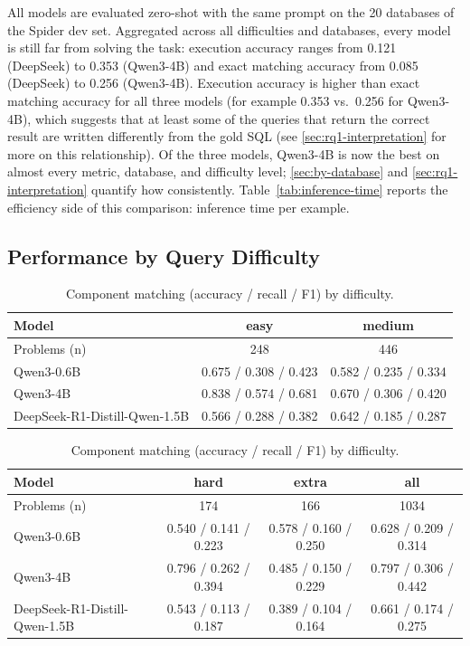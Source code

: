 All models are evaluated zero-shot with the same prompt on the 20 databases of the Spider dev set. Aggregated across all difficulties and databases, every model is still far from solving the task: execution accuracy ranges from 0.121 (DeepSeek) to 0.353 (Qwen3-4B) and exact matching accuracy from 0.085 (DeepSeek) to 0.256 (Qwen3-4B). Execution accuracy is higher than exact matching accuracy for all three models (for example 0.353 vs.\ 0.256 for Qwen3-4B), which suggests that at least some of the queries that return the correct result are written differently from the gold SQL (see \ref{sec:rq1-interpretation} for more on this relationship). Of the three models, Qwen3-4B is now the best on almost every metric, database, and difficulty level; \ref{sec:by-database} and \ref{sec:rq1-interpretation} quantify how consistently. Table~\ref{tab:inference-time} reports the efficiency side of this comparison: inference time per example.

\subsection{Performance by Query Difficulty}
\label{sec:by-difficulty}

\begin{table}[H]
\centering
\footnotesize
\caption{Component matching (accuracy / recall / F1) by difficulty.}
\label{tab:difficulty-component}
\begin{tabular}{lcc}
\toprule
Model & easy & medium \\
\midrule
Problems (n) & 248 & 446 \\
Qwen3-0.6B & 0.675 / 0.308 / 0.423 & 0.582 / 0.235 / 0.334 \\
Qwen3-4B & 0.838 / 0.574 / 0.681 & 0.670 / 0.306 / 0.420 \\
DeepSeek-R1-Distill-Qwen-1.5B & 0.566 / 0.288 / 0.382 & 0.642 / 0.185 / 0.287 \\
\bottomrule
\end{tabular}

\vspace{0.5em}

\begin{tabular}{lccc}
\toprule
Model & hard & extra & all \\
\midrule
Problems (n) & 174 & 166 & 1034 \\
Qwen3-0.6B & 0.540 / 0.141 / 0.223 & 0.578 / 0.160 / 0.250 & 0.628 / 0.209 / 0.314 \\
Qwen3-4B & 0.796 / 0.262 / 0.394 & 0.485 / 0.150 / 0.229 & 0.797 / 0.306 / 0.442 \\
DeepSeek-R1-Distill-Qwen-1.5B & 0.543 / 0.113 / 0.187 & 0.389 / 0.104 / 0.164 & 0.661 / 0.174 / 0.275 \\
\bottomrule
\end{tabular}
\end{table}

